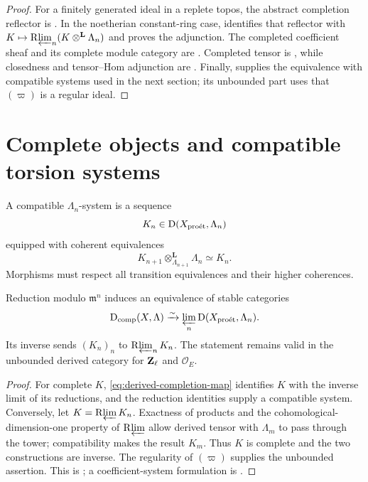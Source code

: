 \begin{proof}
For a finitely generated ideal in a replete topos, the abstract completion
reflector is \cite[Lemma~3.4.9]{BhattScholzeProEtale}.  In the noetherian
constant-ring case, \cite[Proposition~3.5.1]{BhattScholzeProEtale} identifies
that reflector with \(K\mapsto\mathrm R\!\varprojlim_n(K\otimes^{\mathbf L}\Lambda_n)\) and
proves the adjunction.  The completed coefficient sheaf and its complete
module category are \cite[Definition~3.5.2]{BhattScholzeProEtale}.
Completed tensor is \cite[Definition~3.4.10]{BhattScholzeProEtale}, while
closedness and tensor--Hom adjunction are
\cite[Lemma~3.4.11]{BhattScholzeProEtale}.  Finally,
\cite[Lemma~3.5.7]{BhattScholzeProEtale} supplies the equivalence with
compatible systems used in the next section; its unbounded part uses that
\((\varpi)\) is a regular ideal.
\end{proof}

\section{Complete objects and compatible torsion systems}

\begin{definition}
A compatible \(\Lambda_n\)-system is a sequence
\[
 K_n\in\mathrm D(X_{\mathrm{pro\acute et}},\Lambda_n)
\]
equipped with coherent equivalences
\[
 K_{n+1}\otimes^{\mathbf L}_{\Lambda_{n+1}}\Lambda_n
   \simeq K_n.
\]
Morphisms must respect all transition equivalences and their higher
coherences.
\end{definition}

\begin{theorem}
\label{thm:proetale-complete-system-equivalence}
Reduction modulo \(\mathfrak m^n\) induces an equivalence of stable
categories
\begin{equation}
\label{eq:completion-system-equivalence}
 \mathrm D_{\mathrm{comp}}(X,\Lambda)
   \xrightarrow{\sim}
 \varprojlim_n \mathrm D(X_{\mathrm{pro\acute et}},\Lambda_n).
\end{equation}
Its inverse sends \((K_n)_n\) to \(\mathrm R\!\varprojlim_n K_n\).  The statement remains
valid in the unbounded derived category for \(\mathbf Z_\ell\) and \(\mathcal O_E\).
\end{theorem}

\begin{proof}
For complete \(K\), \cref{eq:derived-completion-map} identifies \(K\) with
the inverse limit of its reductions, and the reduction identities supply a
compatible system.  Conversely, let \(K=\mathrm R\!\varprojlim K_n\).  Exactness of products
and the cohomological-dimension-one property of \(\mathrm R\!\varprojlim\) allow derived
tensor with \(\Lambda_m\) to pass through the tower; compatibility makes the
result \(K_m\).  Thus \(K\) is complete and the two constructions are inverse.
The regularity of \((\varpi)\) supplies the unbounded assertion.  This is
\cite[Lemma~3.5.7]{BhattScholzeProEtale}; a coefficient-system formulation is
\cite[Proposition~5.1]{HRSConstructible}.
\end{proof}

